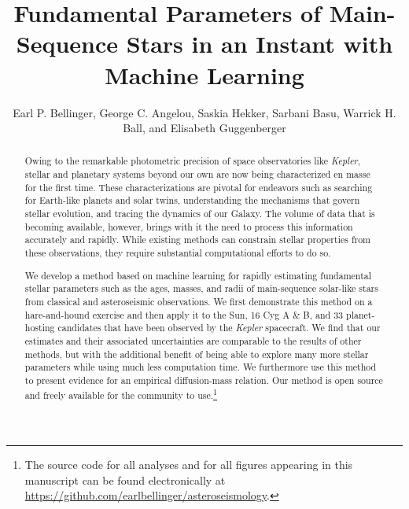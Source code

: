 \documentclass[twocolumn,twocolappendix]{aastex6}
\begin{document}
\title{Fundamental Parameters of Main-Sequence Stars in an Instant with Machine Learning}

\author{Earl P. Bellinger, George C. Angelou, Saskia Hekker, Sarbani Basu, Warrick H. Ball, and Elisabeth Guggenberger}

\begin{abstract}
Owing to the remarkable photometric precision of space observatories like \emph{Kepler}, stellar and planetary systems beyond our own are now being characterized en masse for the first time. These characterizations are pivotal for endeavors such as searching for Earth-like planets and solar twins, understanding the mechanisms that govern stellar evolution, and tracing the dynamics of our Galaxy. The volume of data that is becoming available, however, brings with it the need to process this information accurately and rapidly. While existing methods can constrain stellar properties from these observations, they require substantial computational efforts to do so. 

We develop a method based on machine learning for rapidly estimating fundamental stellar parameters such as the ages, masses, and radii of main-sequence solar-like stars from classical and asteroseismic observations. We first demonstrate this method on a hare-and-hound exercise and then apply it to the Sun, 16 Cyg A \& B, and 33 planet-hosting candidates that have been observed by the \emph{Kepler} spacecraft. We find that our estimates and their associated uncertainties are comparable to the results of other methods, but with the additional benefit of being able to explore many more stellar parameters while using much less computation time. We furthermore use this method to present evidence for an empirical diffusion-mass relation. Our method is open source and freely available for the community to use.\footnote{The source code for all analyses and for all figures appearing in this manuscript can be found electronically at \url{https://github.com/earlbellinger/asteroseismology}.}
\end{abstract}
\end{document}
